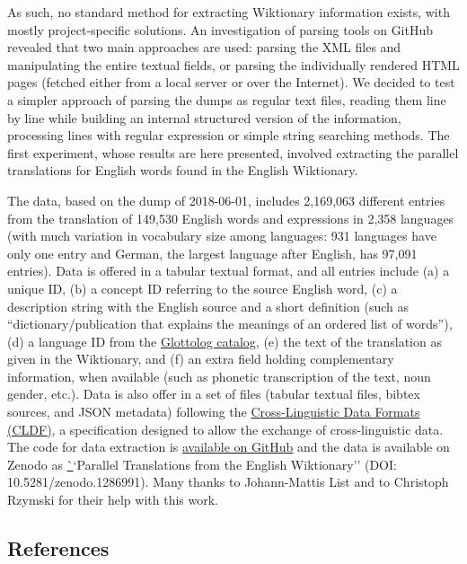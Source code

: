 \documentclass[
  english,
  a4paper,
  oneside,tablecaptionabove
]{scrbook}
\begin{document}
As such, no standard method for extracting Wiktionary information
exists, with mostly project-specific solutions. An investigation of
parsing tools on GitHub revealed that two main approaches are used:
parsing the XML files and manipulating the entire textual fields, or
parsing the individually rendered HTML pages (fetched either from a
local server or over the Internet). We decided to test a simpler
approach of parsing the dumps as regular text files, reading them line
by line while building an internal structured version of the
information, processing lines with regular expression or simple string
searching methods. The first experiment, whose results are here
presented, involved extracting the parallel translations for English
words found in the English Wiktionary.

The data, based on the dump of 2018-06-01, includes 2,169,063 different
entries from the translation of 149,530 English words and expressions in
2,358 languages (with much variation in vocabulary size among languages:
931 languages have only one entry and German, the largest language after
English, has 97,091 entries). Data is offered in a tabular textual
format, and all entries include (a) a unique ID, (b) a concept ID
referring to the source English word, (c) a description string with the
English source and a short definition (such as ``dictionary/publication
that explains the meanings of an ordered list of words''), (d)
a language ID from the \href{http://glottolog.org}{Glottolog catalog},
(e) the text of the translation as given in the Wiktionary, and (f) an
extra field holding complementary information, when available (such as
phonetic transcription of the text, noun gender, etc.). Data is also
offer in a set of files (tabular textual files, bibtex sources, and JSON
metadata) following the \href{http://cldf.clld.org}{Cross-Linguistic
Data Formats (CLDF)}, a specification designed to allow the exchange of
cross-linguistic data. The code for data extraction is
\href{https://github.com/tresoldi/wiktionary_parser}{available on
GitHub} and the data is available on Zenodo as
\href{https://zenodo.org/record/1286991}``Parallel Translations from the
English Wiktionary'' (DOI: 10.5281/zenodo.1286991). Many thanks to
Johann-Mattis List and to Christoph Rzymski for their help with this
work.

\hypertarget{references}{\subsection*{References}\label{references}}
\end{document}
